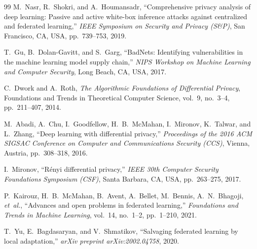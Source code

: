 \documentclass[11pt,a4paper,oneside]{report}
\begin{document}
\begin{thebibliography}{99}
M.~Nasr, R.~Shokri, and A.~Houmansadr, ``Comprehensive privacy
analysis of deep learning: Passive and active white-box inference
attacks against centralized and federated learning,'' \emph{IEEE
Symposium on Security and Privacy (S\&P)}, San Francisco, CA, USA,
pp.~739--753, 2019.

T.~Gu, B.~Dolan-Gavitt, and S.~Garg, ``BadNets: Identifying
vulnerabilities in the machine learning model supply chain,''
\emph{NIPS Workshop on Machine Learning and Computer Security},
Long Beach, CA, USA, 2017.

C.~Dwork and A.~Roth, \emph{The Algorithmic Foundations of
Differential Privacy}, Foundations and Trends in Theoretical
Computer Science, vol.~9, no.~3--4, pp.~211--407, 2014.

M.~Abadi, A.~Chu, I.~Goodfellow, H.~B.~McMahan, I.~Mironov, K.~Talwar,
and L.~Zhang, ``Deep learning with differential privacy,''
\emph{Proceedings of the 2016 ACM SIGSAC Conference on Computer and
Communications Security (CCS)}, Vienna, Austria, pp.~308--318,
2016.

I.~Mironov, ``R\'enyi differential privacy,'' \emph{IEEE 30th
Computer Security Foundations Symposium (CSF)}, Santa Barbara, CA,
USA, pp.~263--275, 2017.

P.~Kairouz, H.~B.~McMahan, B.~Avent, A.~Bellet, M.~Bennis, A.~N.~Bhagoji,
\textit{et~al.}, ``Advances and open problems in federated
learning,'' \emph{Foundations and Trends in Machine Learning},
vol.~14, no.~1--2, pp.~1--210, 2021.

T.~Yu, E.~Bagdasaryan, and V.~Shmatikov, ``Salvaging federated
learning by local adaptation,'' \emph{arXiv preprint
arXiv:2002.04758}, 2020.

\end{thebibliography}
\end{document}
